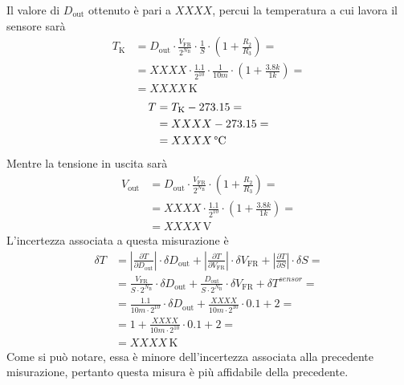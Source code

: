 \documentclass[a4paper]{article}
\newcommand\abs[1]{\left|#1\right|}
\begin{document}
			Il valore di $ D_{\mathrm{out}} $ ottenuto è pari a $ XXXX $, percui la temperatura a cui lavora il sensore sarà
			\begin{equation*}
				\begin{split}
					T_{\mathrm{K}} &= D_{\mathrm{out}} \cdot \frac{V_{\mathrm{FR}}}{2^{N_{\mathrm{B}}}} \cdot \frac{1}{S} \cdot (1 + \frac{R_{2}}{R_{3}}) = \\
								   &= XXXX \cdot \frac{1.1}{2^{10}} \cdot \frac{1}{10m} \cdot (1 + \frac{3.8k}{1k}) = \\
								   &= XXXX \, \mathrm{K}
				\end{split}
			\end{equation*}
			\begin{equation*}
				\begin{split}
					T &= T_{\mathrm{K}} - 273.15 = \\
					  &= XXXX - 273.15 = \\
					  &= XXXX \, \mathrm{\text{\textdegree} C}
				\end{split}
			\end{equation*}
			Mentre la tensione in uscita sarà
			\begin{equation*}
				\begin{split}
					V_{\mathrm{out}} &= D_{\mathrm{out}} \cdot \frac{V_{\mathrm{FR}}}{2^{N_{\mathrm{B}}}} \cdot (1 + \frac{R_{2}}{R_{3}}) = \\
									 &= XXXX \cdot \frac{1.1}{2^{10}} \cdot (1 + \frac{3.8k}{1k}) = \\
									 &= XXXX \, \mathrm{V}
				\end{split}
			\end{equation*}
			L'incertezza associata a questa misurazione è
			\begin{equation*}
				\begin{split}
					\delta T &= \abs{\frac{\partial T}{\partial D_{\mathrm{out}}}} \cdot \delta D_{\mathrm{out}} + \abs{\frac{\partial T}{\partial V_{\mathrm{FR}}}} \cdot \delta V_{\mathrm{FR}} + \abs{\frac{\partial T}{\partial S}} \cdot \delta S = \\
							 &= \frac{V_{\mathrm{FR}}}{S \cdot 2^{N_{\mathrm{B}}}} \cdot \delta D_{\mathrm{out}} + \frac{D_{\mathrm{out}}}{S \cdot 2^{N_{\mathrm{B}}}} \cdot \delta V_{\mathrm{FR}} + \delta T^{sensor} = \\
							 &= \frac{1.1}{10m \cdot 2^{10}} \cdot \delta D_{\mathrm{out}} + \frac{XXXX}{10m \cdot 2^{10}} \cdot 0.1 + 2 = \\
							 &= 1 + \frac{XXXX}{10m \cdot 2^{10}} \cdot 0.1 + 2 = \\
							 &= XXXX \, \mathrm{K}
				\end{split}
			\end{equation*}
			Come si può notare, essa è minore dell'incertezza associata alla precedente misurazione, pertanto questa misura è più affidabile della precedente.
\end{document}
